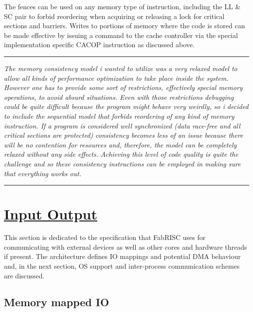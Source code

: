 \documentclass{article}
\begin{document}
            The fences can be used on any memory type of instruction, including the LL \& SC pair to forbid reordering when acquiring or releasing a lock for critical sections and barriers. Writes to portions of memory where the code is stored can be made effective by issuing a command to the cache controller via the special implementation specific CACOP instruction as discussed above.

        \par\noindent\rule{\textwidth}{0.4pt}
        \textit{The memory consistency model i wanted to utilize was a very relaxed model to allow all kinds of performance optimization to take place inside the system. However one has to provide some sort of restrictions, effectively special memory operations, to avoid absurd situations. Even with those restrictions debugging could be quite difficult because the program might behave very weirdly, so i decided to include the sequential model that forbids reordering of any kind of memory instruction. If a program is considered well synchronized (data race-free and all critical sections are protected) consistency becomes less of an issue because there will be no contention for resources and, therefore, the model can be completely relaxed without any side effects. Achieving this level of code quality is quite the challenge and so these consistency instructions can be employed in making sure that everything works out.}
        \par\noindent\rule{\textwidth}{0.4pt}

    \clearpage


    \section[Input Output]{\LARGE\underline{Input Output}}

        This section is dedicated to the specification that FabRISC uses for communicating with external devices as well as other cores and hardware threads if present. The architecture defines IO mappings and potential DMA behaviour and, in the next section, OS support and inter-process communication schemes are discussed.

        \subsection{Memory mapped IO}
\end{document}
